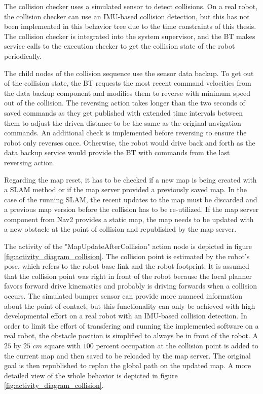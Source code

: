 The collision checker uses a simulated sensor to detect collisions. On a real robot, the collision checker can use an IMU-based collision detection, but this has not been implemented in this behavior tree due to the time constraints of this thesis. The collision checker is integrated into the system supervisor, and the BT makes service calls to the execution checker to get the collision state of the robot periodically. 

The child nodes of the collision sequence use the sensor data backup. To get out of the collision state, the BT requests the most recent command velocities from the data backup component and modifies them to reverse with minimum speed out of the collision. The reversing action takes longer than the two seconds of saved commands as they get published with extended time intervals between them to adjust the driven distance to be the same as the original navigation commands. An additional check is implemented before reversing to ensure the robot only reverses once. Otherwise, the robot would drive back and forth as the data backup service would provide the BT with commands from the last reversing action. 

%

Regarding the map reset, it has to be checked if a new map is being created with a SLAM method or if the map server provided a previously saved map. In the case of the running SLAM, the recent updates to the map must be discarded and a previous map version before the collision has to be re-utilized. If the map server component from Nav2 provides a static map, the map needs to be updated with a new obstacle at the point of collision and republished by the map server. 

The activity of the "MapUpdateAfterCollision" action node is depicted in figure \ref{fig:activity_diagram_collision}. The collision point is estimated by the robot's pose, which refers to the robot base link and the robot footprint. It is assumed that the collision point was right in front of the robot because the local planner favors forward drive kinematics and probably is driving forwards when a collision occurs. The simulated bumper sensor can provide more nuanced information about the point of contact, but this functionality can only be achieved with high developmental effort on a real robot with an IMU-based collision detection. In order to limit the effort of transfering and running the implemented software on a real robot, the obstacle position is simplified to always be in front of the robot. A $25$ by $25$ $cm$ square with $100$ percent occupation at the collision point is added to the current map and then saved to be reloaded by the map server. The original goal is then republished to replan the global path on the updated map. A more detailed view of the whole behavior is depicted in figure \ref{fig:activity_diagram_collision}. 

